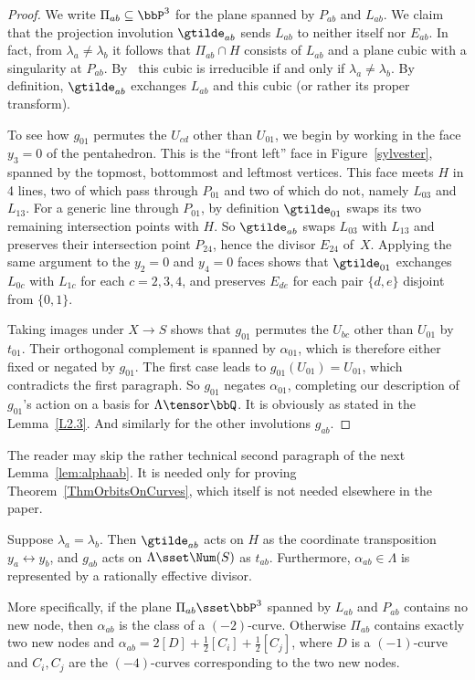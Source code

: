 \begin{proof}
We write $\Pi_{ab}\subseteq\bbP^3$ for the plane spanned by $P_{ab}$ and $L_{ab}$. We claim that the projection involution $\gtilde_{ab}$ sends $L_{ab}$ to neither itself nor $E_{ab}$. In fact, from $\lambda_a\neq\lambda_b$ it follows that $\Pi_{ab}\cap H$ consists of $L_{ab}$ and a plane cubic with a singularity at $P_{ab}$. By~\cite[Lemma~4.6]{DolgachevSalem} this cubic is irreducible if and only if $\lambda_a\ne\lambda_b$. By definition, $\gtilde_{ab}$ exchanges $L_{ab}$ and this cubic (or rather its proper transform).

To see how $g_{01}$ permutes the $U_{cd}$ other than $U_{01}$, we begin by working in the face $y_3=0$ of the pentahedron. This is the ``front left'' face in Figure~\ref{sylvester}, spanned by the topmost, bottommost and leftmost vertices. This face meets $H$ in 4 lines, two of which pass through $P_{01}$ and two of which do not, namely $L_{03}$ and $L_{13}$. For a generic line through $P_{01}$, by definition $\gtilde_{01}$ swaps its two remaining intersection points with $H$. So $\gtilde_{ab}$ swaps $L_{03}$ with $L_{13}$ and preserves their intersection point $P_{24}$, hence the divisor $E_{24}$ of~$X$. Applying the same argument to the $y_2=0$ and $y_4=0$ faces shows that $\gtilde_{01}$ exchanges $L_{0c}$ with $L_{1c}$ for each $c=2,3,4$, and preserves $E_{de}$ for each pair $\{d,e\}$ disjoint from $\{0,1\}$.

Taking images under $X\to S$ shows that $g_{01}$ permutes the $U_{bc}$ other than $U_{01}$ by $t_{01}$. Their orthogonal complement is spanned by $\alpha_{01}$, which is therefore either fixed or negated by $g_{01}$. The first case leads to $g_{01}(U_{01})=U_{01}$, which contradicts the first paragraph. So $g_{01}$ negates $\alpha_{01}$, completing our description of $g_{01}$'s action on a basis for $\Lambda\tensor\bbQ$. It is obviously as stated in the Lemma~\ref{L2.3}. And similarly for the other involutions $g_{ab}$.
\end{proof}

The reader may skip the rather technical second paragraph of the next Lemma~\ref{lem:alphaab}. It is needed only for proving Theorem~\ref{ThmOrbitsOnCurves}, which itself is not needed elsewhere in the paper.

\begin{lemm}\label{lem:alphaab}
Suppose $\lambda_a=\lambda_b$. Then $\gtilde_{ab}$ acts on $H$ as the coordinate transposition $y_a\leftrightarrow y_b$, and $g_{ab}$ acts on $\Lambda\sset\Num(S)$ as $t_{ab}$. Furthermore, $\alpha_{ab}\in\Lambda$ is represented by a rationally effective divisor.

More specifically, if the plane $\Pi_{ab}\sset\bbP^3$ spanned by $L_{ab}$ and $P_{ab}$ contains no new node, then $\alpha_{ab}$ is the class of a $(-2)$-curve. Otherwise $\Pi_{ab}$ contains exactly two new nodes and $\alpha_{ab}=2[D]+\frac12[C_i]+\frac12[C_j]$, where $D$ is a $(-1)$-curve and $C_i,C_j$ are the $(-4)$-curves corresponding to the two new nodes.
\end{lemm}

